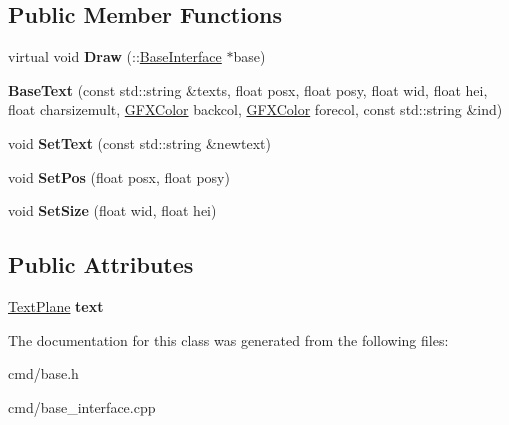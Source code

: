 \subsection*{Public Member Functions}
\begin{DoxyCompactItemize}
\item 
virtual void {\bfseries Draw} (\+::\hyperlink{classBaseInterface}{Base\+Interface} $\ast$base)\hypertarget{classBaseInterface_1_1Room_1_1BaseText_ac16b16616e0904b59c9d882cd0e59004}{}\label{classBaseInterface_1_1Room_1_1BaseText_ac16b16616e0904b59c9d882cd0e59004}

\item 
{\bfseries Base\+Text} (const std\+::string \&texts, float posx, float posy, float wid, float hei, float charsizemult, \hyperlink{structGFXColor}{G\+F\+X\+Color} backcol, \hyperlink{structGFXColor}{G\+F\+X\+Color} forecol, const std\+::string \&ind)\hypertarget{classBaseInterface_1_1Room_1_1BaseText_a7bf0e7767ff79efce8795980a3df36b4}{}\label{classBaseInterface_1_1Room_1_1BaseText_a7bf0e7767ff79efce8795980a3df36b4}

\item 
void {\bfseries Set\+Text} (const std\+::string \&newtext)\hypertarget{classBaseInterface_1_1Room_1_1BaseText_ae9e26324d1d7cb31eda787ebfdd62792}{}\label{classBaseInterface_1_1Room_1_1BaseText_ae9e26324d1d7cb31eda787ebfdd62792}

\item 
void {\bfseries Set\+Pos} (float posx, float posy)\hypertarget{classBaseInterface_1_1Room_1_1BaseText_add7771f6070359fb1f445277f87a20be}{}\label{classBaseInterface_1_1Room_1_1BaseText_add7771f6070359fb1f445277f87a20be}

\item 
void {\bfseries Set\+Size} (float wid, float hei)\hypertarget{classBaseInterface_1_1Room_1_1BaseText_aff8663d0dd679e7ed95a04e2b396c6c0}{}\label{classBaseInterface_1_1Room_1_1BaseText_aff8663d0dd679e7ed95a04e2b396c6c0}

\end{DoxyCompactItemize}
\subsection*{Public Attributes}
\begin{DoxyCompactItemize}
\item 
\hyperlink{classTextPlane}{Text\+Plane} {\bfseries text}\hypertarget{classBaseInterface_1_1Room_1_1BaseText_ae05993930a3f74068b11bbaceb9f89a4}{}\label{classBaseInterface_1_1Room_1_1BaseText_ae05993930a3f74068b11bbaceb9f89a4}

\end{DoxyCompactItemize}


The documentation for this class was generated from the following files\+:\begin{DoxyCompactItemize}
\item 
cmd/base.\+h\item 
cmd/base\+\_\+interface.\+cpp\end{DoxyCompactItemize}
